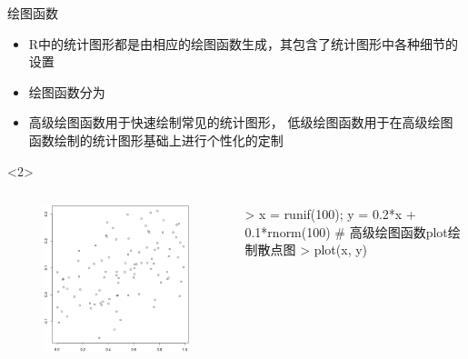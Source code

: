 \documentclass{beamerthemeMono}
\begin{document}
\begin{frame}[t,fragile]{\subsecname}{绘图函数}
\begin{itemize}
\item R中的统计图形都是由相应的绘图函数生成，其包含了统计图形中各种细节的设置
\item 绘图函数分为
\item 高级绘图函数用于快速绘制常见的统计图形，
低级绘图函数用于在高级绘图函数绘制的统计图形基础上进行个性化的定制
\end{itemize}

\begin{overlayarea}{\textwidth}{\textheight}
\begin{onlyenv}<2>
\begin{columns}
        \begin{column}{.4\textwidth}
          \begin{figure}
            \centering
            \includegraphics[width=\columnwidth]{高级绘图函数.png}
          \end{figure}
        \end{column}

        \begin{column}{.6\textwidth}
 \centering
\begin{rcode}
> x = runif(100); y = 0.2*x + 0.1*rnorm(100)
# 高级绘图函数plot绘制散点图
> plot(x, y)
\end{rcode}
        \end{column}
      \end{columns}
\end{onlyenv}


\end{overlayarea}
\end{frame}
\end{document}
